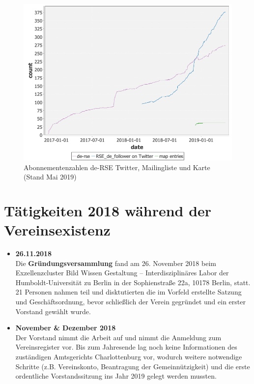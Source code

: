 \begin{figure}[htb]
  \centering
  \includegraphics[width=.75\textwidth]{2019_05_mailinglist_counter}
  \caption{Abonnementenzahlen de-RSE Twitter, Mailingliste und Karte (Stand Mai 2019) \label{fig:abo201905}}
\end{figure}

\section{Tätigkeiten 2018 während der Vereinsexistenz}

\begin{itemize}
 \item \textbf{26.11.2018}\\
  Die \textbf{Gründungsversammlung} fand am 26. November 2018 beim Exzellenzcluster Bild Wissen Gestaltung -- Interdisziplinäres Labor der Humboldt-Universität zu Berlin in der Sophienstraße 22a, 10178 Berlin, statt.
  21 Personen nahmen teil und disktutierten die im Vorfeld erstellte Satzung und Geschäftsordnung, bevor schließlich der Verein gegründet und ein erster Vorstand gewählt wurde.
 \item \textbf{November \& Dezember 2018}\\
  Der Vorstand nimmt die Arbeit auf und nimmt die Anmeldung zum Vereinsregister vor.
  Bis zum Jahresende lag noch keine Informationen des zuständigen Amtsgerichts Charlottenburg vor, wodurch weitere notwendige Schritte (z.B. Vereinskonto, Beantragung der Gemeinnützigkeit) und die erste ordentliche Vorstandssitzung ins Jahr 2019 gelegt werden mussten.
\end{itemize}




